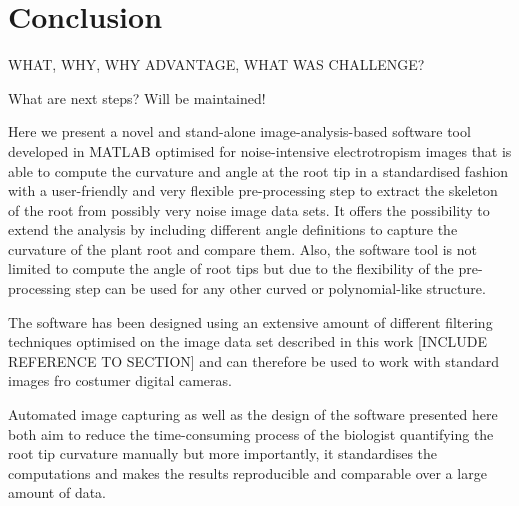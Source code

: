 
\chapter{Conclusion} %

\label{conclusion} %

%


WHAT, WHY, WHY ADVANTAGE, WHAT WAS CHALLENGE?


What are next steps? Will be maintained!



Here we present a novel and stand-alone image-analysis-based software tool developed in MATLAB optimised for noise-intensive electrotropism images that is able to compute the curvature and angle at the root tip in a standardised fashion with a user-friendly and very flexible pre-processing step to extract the skeleton of the root from possibly very noise image data sets. 
It offers the possibility to extend the analysis by including different angle definitions to capture the curvature of the plant root and compare them. Also, the software tool is not limited to compute the angle of root tips but due to the flexibility of the pre-processing step can be used for any other curved or polynomial-like structure. 

The software has been designed using an extensive amount of different filtering techniques optimised on the image data set described in this work [INCLUDE REFERENCE TO SECTION] and can therefore be used to work with standard images fro costumer digital cameras. 

Automated image capturing as well as the design of the software presented here both aim to reduce the time-consuming process of the biologist quantifying the root tip curvature manually but more importantly, it standardises the computations and makes the results reproducible and comparable over a large amount of data. 

